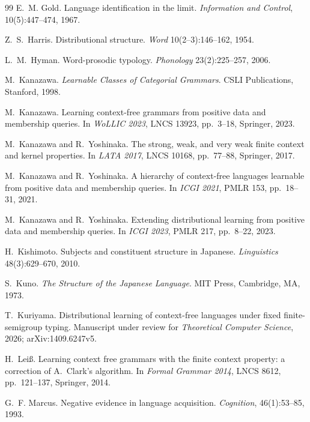 \documentclass[11pt,a4paper]{ltjsarticle}
\numberwithin{equation}{section}
\theoremstyle{plain}
\theoremstyle{definition}
\theoremstyle{remark}
\theoremstyle{plain}
\begin{document}
\begin{thebibliography}{99}
E.~M. Gold.
Language identification in the limit.
\textit{Information and Control}, 10(5):447--474, 1967.

Z.~S.~Harris.
Distributional structure.
\textit{Word} 10(2--3):146--162, 1954.

L.~M.~Hyman.
Word-prosodic typology.
\textit{Phonology} 23(2):225--257, 2006.

M.~Kanazawa.
\textit{Learnable Classes of Categorial Grammars}.
CSLI Publications, Stanford, 1998.

M.~Kanazawa.
Learning context-free grammars from positive data and membership queries.
In \textit{WoLLIC 2023}, LNCS 13923, pp.~3--18, Springer, 2023.

M.~Kanazawa and R.~Yoshinaka.
The strong, weak, and very weak finite context and kernel properties.
In \textit{LATA 2017}, LNCS 10168, pp.~77--88, Springer, 2017.

M.~Kanazawa and R.~Yoshinaka.
A hierarchy of context-free languages learnable from positive data and
membership queries.
In \textit{ICGI 2021}, PMLR 153, pp.~18--31, 2021.

M.~Kanazawa and R.~Yoshinaka.
Extending distributional learning from positive data and membership
queries.
In \textit{ICGI 2023}, PMLR 217, pp.~8--22, 2023.

H.~Kishimoto.
Subjects and constituent structure in Japanese.
\textit{Linguistics} 48(3):629--670, 2010.

S.~Kuno.
\textit{The Structure of the Japanese Language}.
MIT Press, Cambridge, MA, 1973.

T.~Kuriyama.
Distributional learning of context-free languages under fixed
finite-semigroup typing.
Manuscript under review for \textit{Theoretical Computer Science}, 2026;
arXiv:1409.6247v5.

H.~Lei{\ss}.
Learning context free grammars with the finite context property: a
correction of A.~Clark's algorithm.
In \textit{Formal Grammar 2014}, LNCS 8612, pp.~121--137, Springer, 2014.

G.~F. Marcus.
Negative evidence in language acquisition.
\textit{Cognition}, 46(1):53--85, 1993.


\end{thebibliography}
\end{document}
